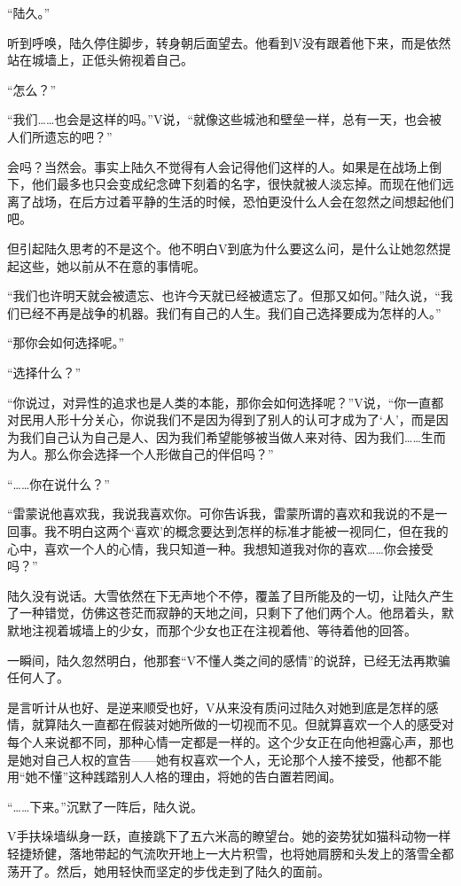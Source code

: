 “陆久。”

听到呼唤，陆久停住脚步，转身朝后面望去。他看到V没有跟着他下来，而是依然站在城墙上，正低头俯视着自己。

“怎么？”

“我们……也会是这样的吗。”V说，“就像这些城池和壁垒一样，总有一天，也会被人们所遗忘的吧？”

会吗？当然会。事实上陆久不觉得有人会记得他们这样的人。如果是在战场上倒下，他们最多也只会变成纪念碑下刻着的名字，很快就被人淡忘掉。而现在他们远离了战场，在后方过着平静的生活的时候，恐怕更没什么人会在忽然之间想起他们吧。

但引起陆久思考的不是这个。他不明白V到底为什么要这么问，是什么让她忽然提起这些，她以前从不在意的事情呢。

“我们也许明天就会被遗忘、也许今天就已经被遗忘了。但那又如何。”陆久说，“我们已经不再是战争的机器。我们有自己的人生。我们自己选择要成为怎样的人。”

“那你会如何选择呢。”

“选择什么？”

“你说过，对异性的追求也是人类的本能，那你会如何选择呢？”V说，“你一直都对民用人形十分关心，你说我们不是因为得到了别人的认可才成为了‘人’，而是因为我们自己认为自己是人、因为我们希望能够被当做人来对待、因为我们……生而为人。那么你会选择一个人形做自己的伴侣吗？”

“……你在说什么？”

“雷蒙说他喜欢我，我说我喜欢你。可你告诉我，雷蒙所谓的喜欢和我说的不是一回事。我不明白这两个‘喜欢’的概念要达到怎样的标准才能被一视同仁，但在我的心中，喜欢一个人的心情，我只知道一种。我想知道我对你的喜欢……你会接受吗？”

陆久没有说话。大雪依然在下无声地个不停，覆盖了目所能及的一切，让陆久产生了一种错觉，仿佛这苍茫而寂静的天地之间，只剩下了他们两个人。他昂着头，默默地注视着城墙上的少女，而那个少女也正在注视着他、等待着他的回答。

一瞬间，陆久忽然明白，他那套“V不懂人类之间的感情”的说辞，已经无法再欺骗任何人了。

是言听计从也好、是逆来顺受也好，V从来没有质问过陆久对她到底是怎样的感情，就算陆久一直都在假装对她所做的一切视而不见。但就算喜欢一个人的感受对每个人来说都不同，那种心情一定都是一样的。这个少女正在向他袒露心声，那也是她对自己人权的宣告——她有权喜欢一个人，无论那个人接不接受，他都不能用“她不懂”这种践踏别人人格的理由，将她的告白置若罔闻。

“……下来。”沉默了一阵后，陆久说。

V手扶垛墙纵身一跃，直接跳下了五六米高的瞭望台。她的姿势犹如猫科动物一样轻捷矫健，落地带起的气流吹开地上一大片积雪，也将她肩膀和头发上的落雪全都荡开了。然后，她用轻快而坚定的步伐走到了陆久的面前。

